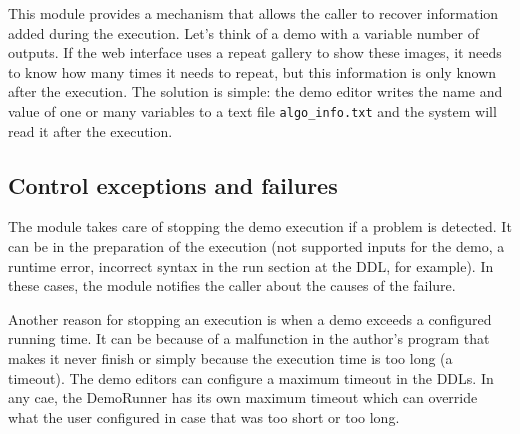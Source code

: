 This module provides a mechanism that allows the caller to recover information added during the execution. Let's think of a demo with a variable number of outputs. If the web interface uses a repeat gallery to show these images, it needs to know how many times it needs to repeat, but this information is only known after the execution. The solution is simple: the demo editor writes the name and value of one or many variables to a text file {\tt algo\_info.txt} and the system will read it after the execution.


\subsection{Control exceptions and failures}
\noindent

The module takes care of stopping the demo execution if a problem is detected. It can be in the preparation of the execution (not supported inputs for the demo, a runtime error, incorrect syntax in the run section at the DDL, for example). In these cases, the module notifies the caller about the causes of the failure.

Another reason for stopping an execution is when a demo exceeds a configured running time. It can be because of a malfunction in the author's program that makes it never finish or simply because the execution time is too long (a timeout). The demo editors can configure a maximum timeout in the DDLs. In any cae, the DemoRunner has its own maximum timeout which can override what the user configured in case that was too short or too long.
